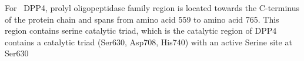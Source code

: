 For~ DPP4, prolyl oligopeptidase family region is located towards the C-terminus of the protein chain and spans from amino acid 559 to amino acid 765. This region contains serine catalytic triad, which is the catalytic region of DPP4 contains a catalytic triad (Ser630, Asp708, His740) with an active Serine site at Ser630  